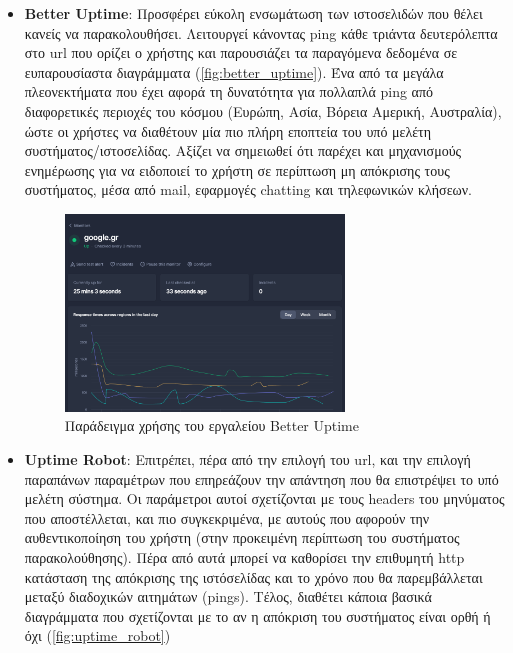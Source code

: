 \begin{itemize}
	\item \textbf{Better Uptime}: Προσφέρει εύκολη ενσωμάτωση των ιστοσελιδών που θέλει κανείς να παρακολουθήσει.
	      Λειτουργεί κάνοντας ping κάθε τριάντα δευτερόλεπτα στο url που ορίζει ο χρήστης και παρουσιάζει
	      τα παραγόμενα δεδομένα σε ευπαρουσίαστα διαγράμματα (\autoref{fig:better_uptime}). Ένα από τα μεγάλα πλεονεκτήματα που έχει αφορά
	      τη δυνατότητα για πολλαπλά ping από διαφορετικές περιοχές του κόσμου (Ευρώπη, Ασία, Βόρεια Αμερική, Αυστραλία),
	      ώστε οι χρήστες να διαθέτουν μία πιο πλήρη εποπτεία του υπό μελέτη συστήματος/ιστοσελίδας. Αξίζει να σημειωθεί
	      ότι παρέχει και μηχανισμούς ενημέρωσης για να ειδοποιεί το χρήστη σε περίπτωση μη απόκρισης τους συστήματος, μέσα
	      από mail, εφαρμογές chatting και τηλεφωνικών κλήσεων.
	      \begin{figure}[!ht]
		      \centering
		      \includegraphics[width=0.7\textwidth]{./images/chapter3/better-uptime-cropped.png}
		      \caption[Παράδειγμα χρήσης του εργαλείου Better Uptime]{Παράδειγμα χρήσης του εργαλείου Better Uptime}
		      \label{fig:better_uptime}
	      \end{figure}
	\item \textbf{Uptime Robot}: Επιτρέπει, πέρα από την επιλογή του url, και την επιλογή παραπάνων παραμέτρων που επηρεάζουν
	      την απάντηση που θα επιστρέψει το υπό μελέτη σύστημα. Οι παράμετροι αυτοί σχετίζονται με τους headers του μηνύματος που
	      αποστέλλεται, και πιο συγκεκριμένα, με αυτούς που αφορούν την αυθεντικοποίηση του χρήστη (στην προκειμένη περίπτωση
	      του συστήματος παρακολούθησης). Πέρα από αυτά μπορεί να καθορίσει την επιθυμητή http κατάσταση της απόκρισης
	      της ιστόσελίδας και το χρόνο που θα παρεμβάλλεται μεταξύ διαδοχικών αιτημάτων (pings). Τέλος, διαθέτει κάποια βασικά διαγράμματα
	      που σχετίζονται με το αν η απόκριση του συστήματος είναι ορθή ή όχι (\autoref{fig:uptime_robot})

\end{itemize}
